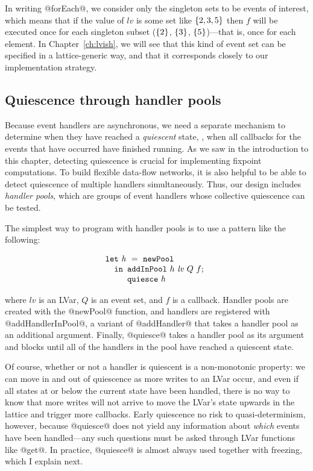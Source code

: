 In writing @forEach@, we consider only the singleton sets to be events
of interest, which means that if the value of $\mathit{lv}$ is some
set like $\left\{2, 3, 5\right\}$ then $f$ will be executed once for each
singleton subset ($\left\{2\right\}$, $\left\{3\right\}$, $\left\{5\right\}$)---that is,
once for each element.  In Chapter~\ref{ch:lvish}, we will see that
this kind of event set can be specified in a lattice-generic way, and
that it corresponds closely to our implementation strategy.

\subsection{Quiescence through handler pools}\label{subsection:quasi-quiescence}

Because event handlers are asynchronous, we need a separate mechanism
to determine when they have reached a \emph{quiescent} state, \ie,
when all callbacks for the events that have occurred have finished
running.  As we saw in the introduction to this chapter, detecting
quiescence is crucial for implementing fixpoint computations.  To
build flexible data-flow networks, it is also helpful to be able to
detect quiescence of multiple handlers simultaneously.  Thus, our
design includes \emph{handler pools}, which are groups of event
handlers whose collective quiescence can be tested.

The simplest way to program with handler pools is to use a pattern
like the following:

\singlespacing
\[
\begin{array}[t]{l}
\termfont{let}~\mathit{h}~=~\NEWPOOL \\
\letspace \termfont{in}
  \begin{array}[t]{l}
    \ADDHANDLERINPOOL~h~\mathit{lv}~Q~f; \\
    \QUIESCE~h
  \end{array}
\end{array}
\]
\doublespacing

where $\mathit{lv}$ is an LVar, $Q$ is an event set, and $f$ is a
callback.  Handler pools are created with the @newPool@ function, and
handlers are registered with @addHandlerInPool@, a variant of
@addHandler@ that takes a handler pool as an additional argument.
Finally, @quiesce@ takes a handler pool as its argument and blocks
until all of the handlers in the pool have reached a quiescent state.

Of course, whether or not a handler is quiescent is a non-monotonic
property: we can move in and out of quiescence as more writes to an
LVar occur, and even if all states at or below the current state have
been handled, there is no way to know that more writes will not arrive
to move the LVar's state upwards in the lattice and trigger more
callbacks.  Early quiescence no risk to quasi-determinism, however,
because @quiesce@ does not yield any information about \emph{which}
events have been handled---any such questions must be asked through
LVar functions like @get@.  In practice, @quiesce@ is almost always
used together with freezing, which I explain next.

